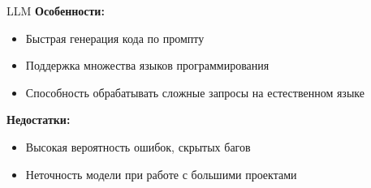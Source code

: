 \begin{frame}{LLM}
\textbf{Особенности:}
\begin{itemize}
    \item Быстрая генерация кода по промпту
    \item Поддержка множества языков программирования
    \item Способность обрабатывать сложные запросы на естественном языке
\end{itemize}

\vspace{0.8cm}
\textbf{Недостатки:}
\begin{itemize}
    \item Высокая вероятность ошибок, скрытых багов
    \item Неточность модели при работе с большими проектами
\end{itemize}
\end{frame}
